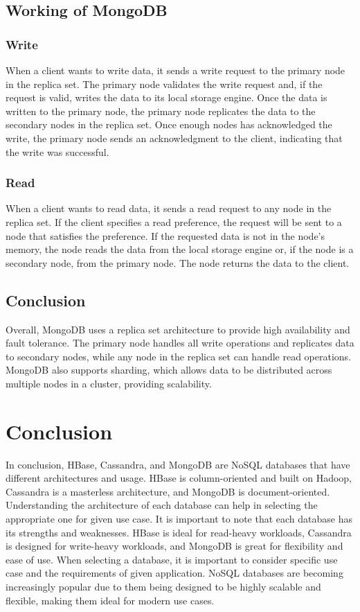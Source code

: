 \documentclass[12pt]{article}
\begin{document}
\subsection{Working of MongoDB}
\subsubsection{Write}
When a client wants to write data, it sends a write request to the primary node in the replica set. The primary node validates the write request and, if the request is valid, writes the data to its local storage engine. Once the data is written to the primary node, the primary node replicates the data to the secondary nodes in the replica set. Once enough nodes has acknowledged the write, the primary node sends an acknowledgment to the client, indicating that the write was successful. 
\subsubsection{Read}
When a client wants to read data, it sends a read request to any node in the replica set. If the client specifies a read preference, the request will be sent to a node that satisfies the preference. If the requested data is not in the node's memory, the node reads the data from the local storage engine or, if the node is a secondary node, from the primary node. The node returns the data to
the client.
\subsection{Conclusion}
Overall, MongoDB uses a replica set architecture to provide high availability and fault tolerance. The primary node handles all write operations and
replicates data to secondary nodes, while any node in the replica set can handle read operations. MongoDB also supports sharding, which allows data to be distributed across multiple nodes in a cluster, providing scalability.
\pagebreak
\section{Conclusion}
In conclusion, HBase, Cassandra, and MongoDB are NoSQL databases that have different architectures and usage. HBase is column-oriented and built on Hadoop, Cassandra is a masterless architecture, and MongoDB is document-oriented. Understanding the architecture of each database can help in selecting the appropriate one for given use case. It is important to note that each database has its strengths and weaknesses. HBase is ideal for read-heavy workloads, Cassandra is designed for write-heavy workloads, and MongoDB is great for
flexibility and ease of use. When selecting a database, it is important to consider specific use case and the requirements of given application. NoSQL databases are becoming increasingly popular due to them being designed to be highly scalable and flexible, making them ideal for modern use cases.
\end{document}
